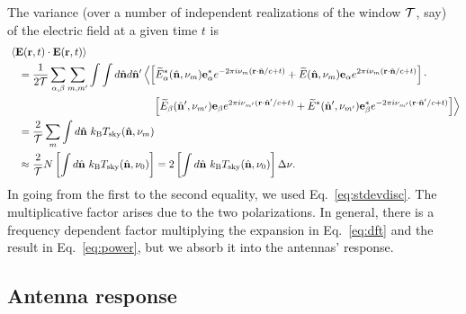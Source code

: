 \documentclass[11pt]{article}
\numberwithin{equation}{section}
\newcommand{\bt}[1]{\mathbf{#1}}
\newcommand{\wt}[1]{\widetilde{#1}}
\newcommand{\kb}{k_{\rm B}}
\begin{document}
The variance (over a number of independent realizations of the window $\cal T$, say) of the electric field at a given time $t$ is  
\begin{align}
~~~ & \!\!\!\!
  \langle {\bt E}(\bt r, t) \cdot {\bt E}(\bt r, t) \rangle \nonumber \\
  & = 
  \frac{1}{2 \cal T} \sum_{\alpha, \beta} \sum_{m, m^\prime} \int\int d\hat{\bt n} d\hat{\bt n}^\prime
  \left\langle \left[ \wt{E}_\alpha^\ast(\hat{\bt n}, \nu_m) {\bt e}_{\alpha}^\ast e^{-2\pi i \nu_m ({\bt r} \cdot \hat{\bt n}/c + t)} + \wt{E}(\hat{\bt n}, \nu_m) {\bt e}_{\alpha} e^{2\pi i \nu_m ({\bt r} \cdot \hat{\bt n}/c + t)} \right] \cdot \right. \nonumber \\
  & \hspace{126pt} \left. \left[ \wt{E}_\beta(\hat{\bt n}^\prime, \nu_{m^\prime}) {\bt e}_{\beta} e^{2\pi i \nu_{m^\prime} ({\bt r} \cdot \hat{\bt n}^\prime/c + t)} + \wt{E}^\ast(\hat{\bt n}^\prime, \nu_{m^\prime}) {\bt e}_{\beta}^\ast e^{-2\pi i \nu_{m^\prime} ({\bt r} \cdot \hat{\bt n}^\prime/c + t)} \right] \right\rangle \nonumber \\  
  & = \frac{2}{\cal T} \sum_{m} \int d\hat{\bt n} \ \kb T_{\rm sky}(\hat{\bt n}, \nu_m) \nonumber \\
  & \approx \frac{2}{\cal T} N \left[ \int d\hat{\bt n} \ \kb T_{\rm sky}(\hat{\bt n}, \nu_0) \right] 
  = 2 \left[ \int d\hat{\bt n} \ \kb T_{\rm sky}(\hat{\bt n}, \nu_0) \right] \Delta \nu \mbox{.} \label{eq:power}
\end{align}
In going from the first to the second equality, we used Eq.~\eqref{eq:stdevdisc}. The multiplicative factor arises due to the two polarizations. In general, there is a frequency dependent factor multiplying the expansion in Eq.~\eqref{eq:dft} and the result in Eq.~\eqref{eq:power}, but we absorb it into the antennas' response.

\subsection{Antenna response}
\label{subsec:antenna}
\end{document}
